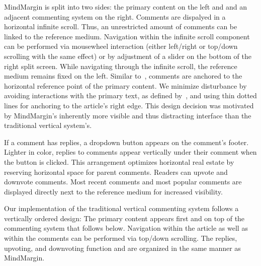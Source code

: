MindMargin is split into two sides: the primary content on the left and and an adjacent commenting system on the right. Comments are dispalyed in a horizontal infinite scroll. Thus, an unrestricted amount of comments can be linked to the reference medium. Navigation within the infinite scroll component can be performed via mousewheel interaction (either left/right or top/down scrolling with the same effect) or by adjustment of a slider on the bottom of the right split screen. While navigating through the infinite scroll, the reference medium remains fixed on the left. Similar to~\cite{FluidDocs, NB}, comments are anchored to the horizontal reference point of the primary content. We minimize disturbance by avoiding interactions with the primary text, as defined by~\cite{FluidDocs}, and using thin dotted lines for anchoring to the article's right edge. This design decision was motivated by MindMargin's inherently more visible and thus distracting interface than the traditional vertical system's. 

If a comment has replies, a dropdown button appears on the comment's footer. Lighter in color, replies to comments appear vertically under their comment when the button is clicked. This arrangement optimizes horizontal real estate by reserving horizontal space for parent comments. Readers can upvote and downvote comments. Most recent comments and most popular comments are displayed directly next to the reference medium for increased visibility.
   
Our implementation of the traditional vertical commenting system follows a vertically ordered design: The primary content appears first and on top of the commenting system that follows below. Navigation within the article as well as within the comments can be performed via top/down scrolling. The replies, upvoting, and downvoting function and are organized in the same manner as MindMargin.